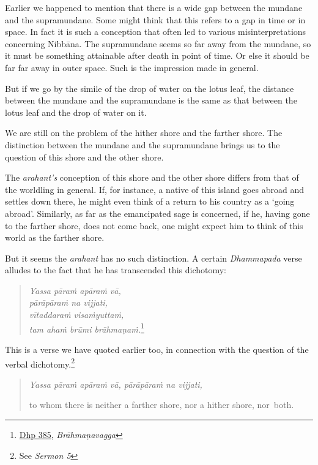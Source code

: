 Earlier we happened to mention that there is a wide gap between the mundane and the supramundane. Some might think that this refers to a gap in time or in space. In fact it is such a conception that often led to various misinterpretations concerning Nibbāna. The supramundane seems so far away from the mundane, so it must be something attainable after death in point of time. Or else it should be far far away in outer space. Such is the impression made in general.

But if we go by the simile of the drop of water on the lotus leaf, the distance between the mundane and the supramundane is the same as that between the lotus leaf and the drop of water on it.

We are still on the problem of the hither shore and the farther shore. The distinction between the mundane and the supramundane brings us to the question of this shore and the other shore.

The \emph{arahant's} conception of this shore and the other shore differs from that of the worldling in general. If, for instance, a native of this island goes abroad and settles down there, he might even think of a return to his country as a `going abroad'. Similarly, as far as the emancipated sage is concerned, if he, having gone to the farther shore, does not come back, one might expect him to think of this world as the farther shore.

But it seems the \emph{arahant} has no such distinction. A certain \emph{Dhammapada} verse alludes to the fact that he has transcended this dichotomy:

\begin{quote}
\emph{Yassa pāraṁ apāraṁ vā,}\\
\emph{pārāpāraṁ na vijjati,}\\
\emph{vītaddaraṁ visaṁyuttaṁ,}\\
\emph{tam ahaṁ brūmi brāhmaṇaṁ.}\footnote{\href{https://suttacentral.net/dhp383-423/pli/ms}{Dhp 385}, \emph{Brāhmaṇavagga}}
\end{quote}

This is a verse we have quoted earlier too, in connection with the question of the verbal dichotomy.\footnote{See \emph{Sermon 5}}

\begin{quote}
\emph{Yassa pāraṁ apāraṁ vā, pārāpāraṁ na vijjati,}

to whom there is neither a farther shore, nor a hither shore, nor~both.
\end{quote}

